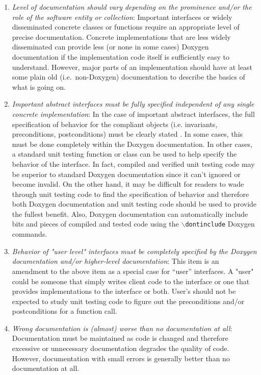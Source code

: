 \begin{enumerate}

{}\item\textit{Level of documentation should vary depending on the prominence
and/or the role of the software entity or collection}: Important interfaces or
widely disseminated concrete classes or functions require an appropriate level
of precise documentation.  Concrete implementations that are less widely
disseminated can provide less (or none in some cases) Doxygen documentation if
the implementation code itself is sufficiently easy to understand.  However,
major parts of an implementation should have at least some plain old (i.e.\
non-Doxygen) documentation to describe the basics of what is going on.

{}\item\textit{Important abstract interfaces must be fully specified
independent of any single concrete implementation}: In the case of important
abstract interfaces, the full specification of behavior for the compliant
objects (i.e. invariants, preconditions, postconditions) must be clearly
stated {}\cite[Item 69]{C++CodingStandards05}.  In some cases, this must be
done completely within the Doxygen documentation.  In other cases, a standard
unit testing function or class can be used to help specify the behavior of the
interface.  In fact, compiled and verified unit testing code may be superior
to standard Doxygen documentation since it can't ignored or become invalid.
On the other hand, it may be difficult for readers to wade through unit
testing code to find the specification of behavior and therefore both Doxygen
documentation and unit testing code should be used to provide the fullest
benefit.  Also, Doxygen documentation can automatically include bits and
pieces of compiled and tested code using the
{}\texttt{$\backslash$dontinclude} Doxygen commands.

{}\item\textit{Behavior of "user level" interfaces must be completely
specified by the Doxygen documentation and/or higher-level documentation}:
This item is an amendment to the above item as a special case for ``user''
interfaces.  A "user" could be someone that simply writes client code to the
interface or one that provides implementations to the interface or both.
User's should not be expected to study unit testing code to figure out the
preconditions and/or postconditions for a function call.

{}\item\textit{Wrong documentation is (almost) worse than no documentation at
all}: Documentation must be maintained as code is changed and therefore
excessive or unnecessary documentation degrades the quality of code.  However,
documentation with small errors is generally better than no documentation at
all.


\end{enumerate}
